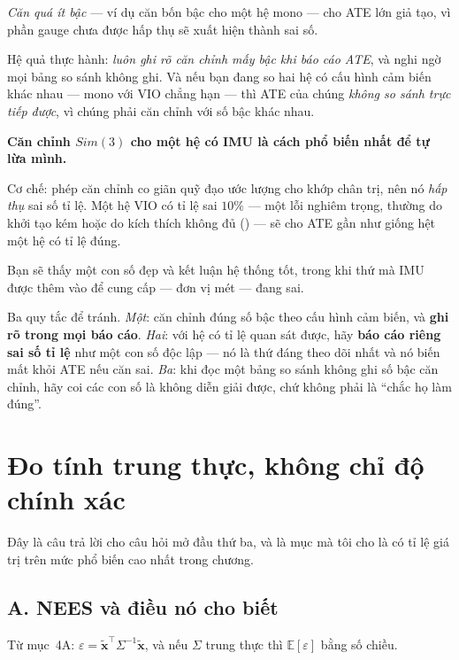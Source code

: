 \documentclass[../../vslam.tex]{subfiles}
\begin{document}
\emph{Căn quá ít bậc} --- ví dụ căn bốn bậc cho một hệ mono --- cho ATE lớn giả tạo, vì phần gauge chưa được hấp thụ sẽ xuất hiện thành sai số.

Hệ quả thực hành: \emph{luôn ghi rõ căn chỉnh mấy bậc khi báo cáo ATE}, và nghi ngờ mọi bảng so sánh không ghi. Và nếu bạn đang so hai hệ có cấu hình cảm biến khác nhau --- mono với VIO chẳng hạn --- thì ATE của chúng \emph{không so sánh trực tiếp được}, vì chúng phải căn chỉnh với số bậc khác nhau.

\begin{cambay}
\textbf{Căn chỉnh \(Sim(3)\) cho một hệ có IMU là cách phổ biến nhất để tự lừa mình.}

Cơ chế: phép căn chỉnh co giãn quỹ đạo ước lượng cho khớp chân trị, nên nó \emph{hấp thụ} sai số tỉ lệ. Một hệ VIO có tỉ lệ sai \(10\%\) --- một lỗi nghiêm trọng, thường do khởi tạo kém hoặc do kích thích không đủ () --- sẽ cho ATE gần như giống hệt một hệ có tỉ lệ đúng.

Bạn sẽ thấy một con số đẹp và kết luận hệ thống tốt, trong khi thứ mà IMU được thêm vào để cung cấp --- đơn vị mét --- đang sai.

Ba quy tắc để tránh. \emph{Một}: căn chỉnh đúng số bậc theo cấu hình cảm biến, và \textbf{ghi rõ trong mọi báo cáo}. \emph{Hai}: với hệ có tỉ lệ quan sát được, hãy \textbf{báo cáo riêng sai số tỉ lệ} như một con số độc lập --- nó là thứ đáng theo dõi nhất và nó biến mất khỏi ATE nếu căn sai. \emph{Ba}: khi đọc một bảng so sánh không ghi số bậc căn chỉnh, hãy coi các con số là không diễn giải được, chứ không phải là ``chắc họ làm đúng''.
\end{cambay}

\section{Đo tính trung thực, không chỉ độ chính xác}

Đây là câu trả lời cho câu hỏi mở đầu thứ ba, và là mục mà tôi cho là có tỉ lệ giá trị trên mức phổ biến cao nhất trong chương.

\subsection{A. NEES và điều nó cho biết}

Từ  mục~4A: \(\varepsilon = \tilde{\mathbf{x}}^{\top}\Sigma^{-1}\tilde{\mathbf{x}}\), và nếu \(\Sigma\) trung thực thì \(\mathbb{E}[\varepsilon]\) bằng số chiều.
\end{document}
